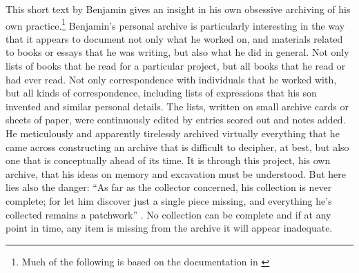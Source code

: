 \documentclass[11pt,a4paper]{article}
\begin{document}
This short text by Benjamin gives an insight in his own obsessive archiving of his own practice.\footnote{Much of the following is based on the documentation in \citet{benjamin2007}} Benjamin's personal archive is particularly interesting in the way that it appears to document not only what he worked on, and materials related to books or essays that he was writing, but also what he did in general. Not only lists of books that he read for a particular project, but all books that he read or had ever read. Not only correspondence with individuals that he worked with, but all kinds of correspondence, including lists of expressions that his son invented and similar personal details. The lists, written on small archive cards or sheets of paper, were continuously edited by entries scored out and notes added. He meticulously and apparently tirelessly archived virtually everything that he came across constructing an archive that is difficult to decipher, at best, but also one that is conceptually ahead of its time. It is through this project, his own archive, that his ideas on memory and excavation must be understood. But here lies also the danger: ``As far as the collector concerned, his collection is never complete; for let him discover just a single piece missing, and everything he's collected remains a patchwork'' \citep[p. 211]{benjamin1999}. No collection can be complete and if at any point in time, any item is missing from the archive it will appear inadequate.
\end{document}
